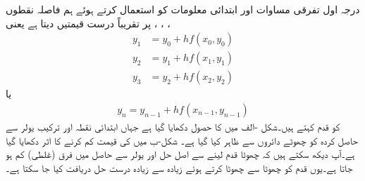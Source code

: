درجہ اول تفرقی مساوات  اور ابتدائی معلومات  کو استعمال کرتے ہوئے   ہم فاصلہ نقطوں ، ، ،  پر تقریباً درست قیمتیں دیتا ہے یعنی
\begin{align*}
y_1&=y_0+hf(x_0,y_0)\\
y_2&=y_1+hf(x_1,y_1)\\
y_3&=y_2+hf(x_2,y_2)
\end{align*}
یا
\begin{align}\label{مساوات_سادہ_اول_یولر_مساوات}
y_n=y_{n-1}+hf(x_{n-1},y_{n-1})
\end{align}
 کو قدم کہتے ہیں۔شکل -الف میں  کا حصول دکھایا گیا ہے  جہاں ابتدائی نقطہ  اور ترکیب یولر سے حاصل کردہ  کو چھوٹے دائروں سے ظاہر کیا گیا ہے۔ شکل-ب میں  کی قیمت کم کرنے کا اثر دکھایا گیا ہے۔آپ دیکھ سکتے ہیں کہ چھوٹا قدم لینے سے اصل حل  اور یولر سے حاصل  میں فرق (غلطی) کم ہو جاتا ہے۔یوں قدم کو چھوٹا سے چھوٹا کرتے ہوئے زیادہ سے زیادہ درست حل دریافت کیا جا سکتا ہے۔
